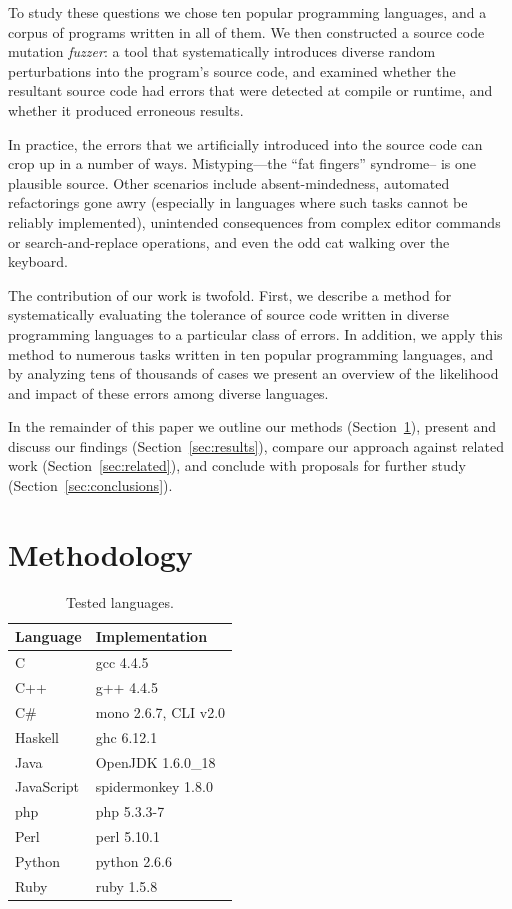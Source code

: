 \documentclass[10pt]{sigplanconf}
\begin{document}
To study these questions we chose ten popular programming languages,
and a corpus of programs written in all of them.
We then constructed a source code mutation {\em fuzzer}:
a tool that systematically introduces diverse random perturbations
into the program's source code,
and examined whether the resultant source code had errors that
were detected at compile or runtime, and whether it produced
erroneous results.

In practice,
the errors that we artificially introduced into the source code can
crop up in a number of ways.
Mistyping---the ``fat fingers'' syndrome-- is one plausible source.
Other scenarios include
absent-mindedness,
automated refactorings gone awry
(especially in languages where such tasks cannot be reliably implemented),
unintended consequences from complex editor commands or
search-and-replace operations,
and even the odd cat walking over the keyboard.

The contribution of our work is twofold.
First, we describe a method for systematically evaluating the tolerance
of source code written in diverse programming languages to a particular
class of errors.
In addition, we apply this method to numerous tasks written in ten popular
programming languages,
and by analyzing tens of thousands of cases we present an overview of
the likelihood and impact of these errors among diverse languages.

In the remainder of this paper we
outline our methods (Section~\ref{sec:method}),
present and discuss our findings (Section~\ref{sec:results}),
compare our approach against related work (Section~\ref{sec:related}),
and conclude with proposals for further study (Section~\ref{sec:conclusions}).

\section{Methodology} %
\label{sec:method}

\begin{table}
\begin{center}
\begin{tabular}{ l l}
Language & Implementation \\
\hline
C 			& gcc 4.4.5 \\
C++ 		& g++ 4.4.5 \\
C\# 		& mono 2.6.7, CLI v2.0 \\
Haskell 	& ghc 6.12.1 \\
Java 		& OpenJDK 1.6.0\_18 \\
JavaScript 	& spidermonkey 1.8.0 \\
{\sc php} 		& {\sc php} 5.3.3-7 \\
Perl 		& perl 5.10.1 \\
Python 		& python 2.6.6 \\
Ruby 		& ruby 1.5.8 \\
\end{tabular}
\end{center}
\caption{Tested languages.}
\label{tab:langs}
\end{table}
\end{document}
